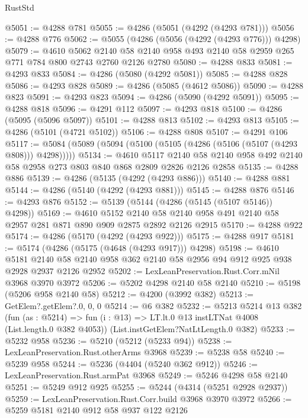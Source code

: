 \begin{lexlean}{RustStd}
\begin{coremodule}
{\begin{coremodule}
{{{{{{{{{{{{{{{{@5051 := @4288 @781
@5055 := @4286 (@5051 (@4292 (@4293 @781)))
@5056 := @4288 @776
@5062 := @5055 (@4286 (@5056 (@4292 (@4293 @776))) @4298)
@5079 := @4610
    @5062
    @2140
    @58
    @2140
    @958
    @493
    @2140
    @58
    @2959
    @265
    @771
    @784
    @800
    @2743
    @2760
    @2126
    @2780
@5080 := @4288 @833
@5081 := @4293 @833
@5084 := @4286 (@5080 (@4292 @5081))
@5085 := @4288 @828
@5086 := @4293 @828
@5089 := @4286 (@5085 (@4612 @5086))
@5090 := @4288 @823
@5091 := @4293 @823
@5094 := @4286 (@5090 (@4292 @5091))
@5095 := @4288 @818
@5096 := @4291 @112
@5097 := @4293 @818
@5100 := @4286 (@5095 (@5096 @5097))
@5101 := @4288 @813
@5102 := @4293 @813
@5105 := @4286 (@5101 (@4721 @5102))
@5106 := @4288 @808
@5107 := @4291 @106
@5117 := @5084 (@5089 (@5094 (@5100 (@5105 (@4286 (@5106 (@5107 (@4293 @808))) @4298)))))
@5134 := @4610
    @5117
    @2140
    @58
    @2140
    @958
    @492
    @2140
    @58
    @2958
    @273
    @803
    @840
    @868
    @2809
    @2826
    @2126
    @2858
@5135 := @4288 @886
@5139 := @4286 (@5135 (@4292 (@4293 @886)))
@5140 := @4288 @881
@5144 := @4286 (@5140 (@4292 (@4293 @881)))
@5145 := @4288 @876
@5146 := @4293 @876
@5152 := @5139 (@5144 (@4286 (@5145 (@5107 @5146)) @4298))
@5169 := @4610
    @5152
    @2140
    @58
    @2140
    @958
    @491
    @2140
    @58
    @2957
    @281
    @871
    @890
    @909
    @2875
    @2892
    @2126
    @2915
@5170 := @4288 @922
@5174 := @4286 (@5170 (@4292 (@4293 @922)))
@5175 := @4288 @917
@5181 := @5174 (@4286 (@5175 (@4648 (@4293 @917))) @4298)
@5198 := @4610
    @5181
    @2140
    @58
    @2140
    @958
    @362
    @2140
    @58
    @2956
    @94
    @912
    @925
    @938
    @2928
    @2937
    @2126
    @2952
@5202 := LexLeanPreservation.Rust.Corr.mNil @3968 @3970 @3972
@5206 := @5202 @4298 @2140 @58 @2140
@5210 := @5198 (@5206 @958 @2140 @58)
@5212 := @4200 (@3992 @382)
@5213 := GetElem?.getElem?.{0, 0, 0}
@5214 := @6 @382
@5232 := @5213
    @5214
    @13
    @382
    (fun (as : @5214) =>
    fun (i : @13) => LT.lt.{0} @13 instLTNat @4008 (List.length.{0} @382 @4053))
    (List.instGetElem?NatLtLength.{0} @382)
@5233 := @5232 @958
@5236 := @5210 (@5212 (@5233 @94))
@5238 := LexLeanPreservation.Rust.otherArms @3968
@5239 := @5238 @58
@5240 := @5239 @958
@5244 := @5236 (@4404 (@5240 @362 @912))
@5246 := LexLeanPreservation.Rust.armPat @3968
@5249 := @5246 @4298 @58 @2140
@5251 := @5249 @912 @925
@5255 := @5244 (@4314 (@5251 @2928 @2937))
@5259 := LexLeanPreservation.Rust.Corr.build @3968 @3970 @3972
@5266 := @5259 @5181 @2140 @912 @58 @937 @122 @2126
}}}}}}}}}}}}}}}}
\end{coremodule}}
\end{coremodule}
\end{lexlean}
